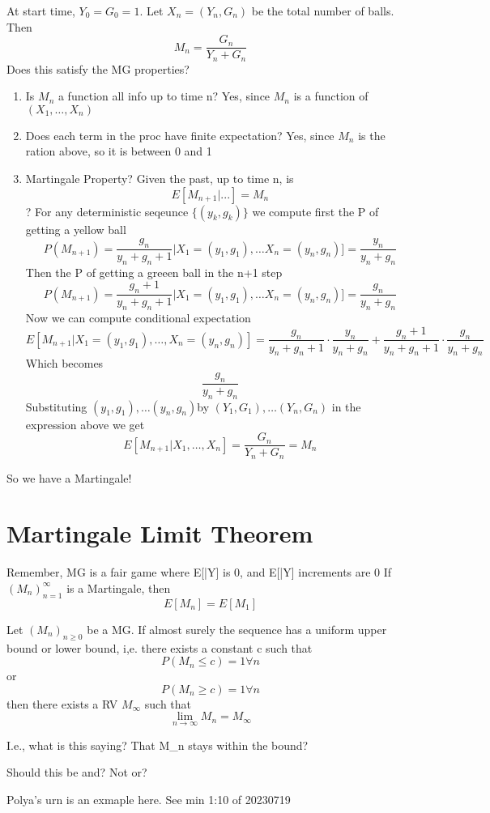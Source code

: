 \documentclass{report}
\begin{document}
    At start time, $Y_0 = G_0 = 1$.  Let $X_n = (Y_n, G_n)$ be the total
    number of balls.  Then 
      \[ M_n = \frac{G_n}{Y_n + G_n}  \]
    Does this satisfy the MG properties?
    \begin{enumerate}
      \item Is $M_n$ a function all info up to time n?  Yes, since $M_n$
        is a function of $(X_1, \dots, X_n)$
      \item Does each term in the proc have finite expectation?  Yes,
        since $M_n$ is the ration above, so it is between 0 and 1
      \item Martingale Property?  Given the past, up to time n, is
        \[ E[M_{n+1}| ... ] = M_n\] ?
        For any deterministic seqeunce $\{(y_k, g_k)\}$ we compute first
        the P of getting a yellow ball
        \[ P(M_{n+1}) = \frac{g_n}{y_n+g_n+1}   | X_1=(y_1, g_1), \dots X_n=(y_n,g_n)] = \frac{y_n}{y_n+g_n} \]
        Then the P of getting a greeen ball in the n+1 step
        \[ P(M_{n+1}) = \frac{g_n+1}{y_n+g_n+1}   | X_1=(y_1, g_1), \dots X_n=(y_n,g_n)] = \frac{g_n}{y_n+g_n} \]
        Now we can compute conditional expectation 
        \[ E[M_{n+1}|X_1=(y_1, g_1), \dots, X_n=(y_n,g_n)] = \frac{g_n}{y_n+g_n+1}  \cdot \frac{y_n}{y_n+g_n}  + \frac{g_n+1}{y_n+g_n+1}  \cdot  \frac{g_n}{y_n+g_n} \]
        Which becomes
        \[ \frac{g_n}{y_n+g_n}  \]
    Substituting $(y_1,g_1), \dots (y_n,g_n)$by $(Y_1,G_1),
    \dots (Y_n,G_n)$ in the expression above we get
    \[ E[M_{n+1}|X_1, \dots, X_n] = \frac{G_n}{Y_n+G_n} = M_n \]
    \end{enumerate}
    So we have a Martingale!

    \section{Martingale Limit Theorem}%
    Remember, MG is a fair game where E[|Y] is 0, and E[|Y] increments
    are 0
     {
      If $(M_n)^{\infty}_{n=1}$ is a Martingale, then
      \[ E[M_n] = E[M_1] \]
    }
     {
      Let $(M_n)_{n \geq 0}$ be a MG.  If almost surely the sequence
      has a uniform upper bound or lower bound, i,e. there exists a
      constant c such that 
        \[ P(M_n \leq c) = 1 \forall n \]
        or
        \[ P(M_n \geq c) = 1 \forall n \]
        then there exists a RV $M_{\infty}$ such that
        \[ \lim_{n \to \infty} M_n = M_{\infty} \]

        I.e., what is this saying?  That M_n stays within the bound?

        Should this be and?  Not or?

        Polya's urn is an exmaple here.  See min 1:10 of 20230719
    }
\end{document}
